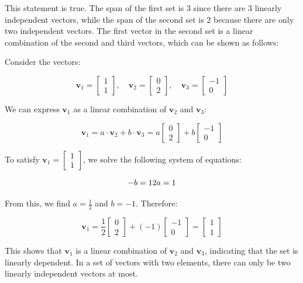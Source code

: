 \documentclass{article}
\begin{document}
This statement is true. The span of the first set is $3$ since there are $3$ linearly independent vectors, while the span of the second set is $2$ because there are only two independent vectors. The first vector in the second set is a linear combination of the second and third vectors, which can be shown as follows:

Consider the vectors:

\[
\mathbf{v}_1 = \begin{bmatrix} 1 \\ 1 \end{bmatrix}, \quad 
\mathbf{v}_2 = \begin{bmatrix} 0 \\ 2 \end{bmatrix}, \quad 
\mathbf{v}_3 = \begin{bmatrix} -1 \\ 0 \end{bmatrix}
\]

We can express $\mathbf{v}_1$ as a linear combination of $\mathbf{v}_2$ and $\mathbf{v}_3$:

\[
\mathbf{v}_1 = a \cdot \mathbf{v}_2 + b \cdot \mathbf{v}_3 = a \begin{bmatrix} 0 \\ 2 \end{bmatrix} + b \begin{bmatrix} -1 \\ 0 \end{bmatrix}
\]

To satisfy $\mathbf{v}_1 = \begin{bmatrix} 1 \\ 1 \end{bmatrix}$, we solve the following system of equations:

\[
- b = 1 \\ 
2a = 1
\]

From this, we find $a = \frac{1}{2}$ and $b = -1$. Therefore:

\[
\mathbf{v}_1 = \frac{1}{2} \begin{bmatrix} 0 \\ 2 \end{bmatrix} + (-1) \begin{bmatrix} -1 \\ 0 \end{bmatrix} = \begin{bmatrix} 1 \\ 1 \end{bmatrix}
\]

This shows that $\mathbf{v}_1$ is a linear combination of $\mathbf{v}_2$ and $\mathbf{v}_3$, indicating that the set is linearly dependent. In a set of vectors with two elements, there can only be two linearly independent vectors at most.
\end{document}
